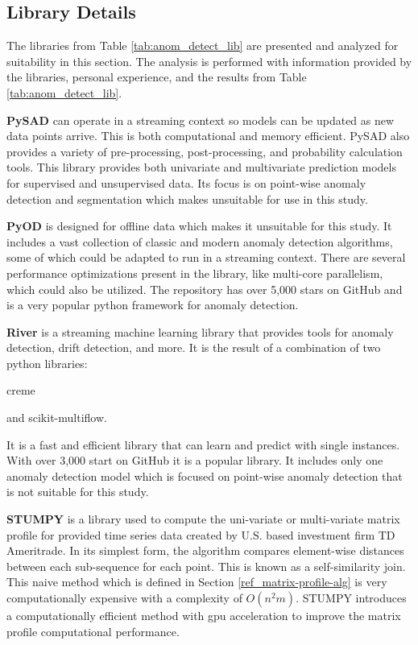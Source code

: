 

\subsection{Library Details}

The libraries from Table \ref{tab:anom_detect_lib} are presented and analyzed for suitability in this section. The analysis is performed with information provided by the libraries, personal experience, and the results from Table \ref{tab:anom_detect_lib}.

\textbf{PySAD} \parencite{pysad} can operate in a streaming context so models can be updated as new data points arrive.
This is both computational and memory efficient.
PySAD also provides a variety of pre-processing, post-processing, and probability calculation tools.
This library provides both univariate and multivariate prediction models for supervised and unsupervised data.
Its focus is on point-wise anomaly detection and segmentation which makes unsuitable for use in this study.


\textbf{PyOD} \parencite{zhao2019pyod} is designed for offline data which makes it unsuitable for this study.
It includes a vast collection of classic and modern anomaly detection algorithms, some of which could be adapted to run in a streaming context.
There are several performance optimizations present in the library, like multi-core parallelism, which could also be utilized.
The repository has over 5,000 stars on GitHub and is a very popular python framework for anomaly detection.

\textbf{River} \parencite{2020river} is a streaming machine learning library that provides tools for anomaly detection, drift detection, and more.
It is the result of a combination of two python libraries:
\begin{inlinelist}
    \item creme
    \item and scikit-multiflow.
\end{inlinelist}
It is a fast and efficient library that can learn and predict with single instances.
With over 3,000 start on GitHub it is a popular library.
It includes only one anomaly detection model which is focused on point-wise anomaly detection that is not suitable for this study.

\textbf{STUMPY} \parencite{law2019stumpy} is a library used to compute the uni-variate or multi-variate matrix profile for provided time series data created by U.S. based investment firm TD Ameritrade.
In its simplest form, the algorithm compares element-wise distances between each sub-sequence for each point.
This is known as a self-similarity join.
This naive method which is defined in Section \ref{ref_matrix-profile-alg} is very computationally expensive with a complexity of $O(n^2m)$.
STUMPY introduces a computationally efficient method with gpu acceleration to improve the matrix profile computational performance.

